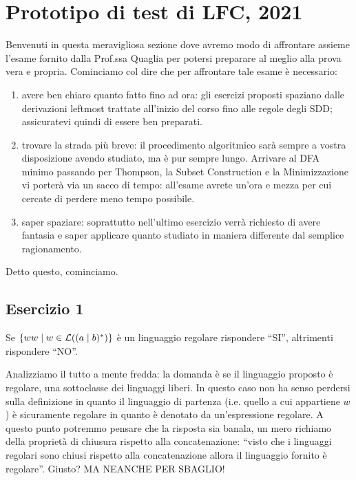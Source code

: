 \documentclass[class=book, crop=false, oneside, 12pt]{standalone}
\begin{document}
\chapter{Prototipo di test di LFC, 2021}


Benvenuti in questa meravigliosa sezione dove avremo modo di affrontare assieme l'esame fornito dalla Prof.ssa Quaglia per potersi preparare al meglio alla prova vera e propria. Cominciamo col dire che per affrontare tale esame è necessario:

\begin{enumerate}
    \item avere ben chiaro quanto fatto fino ad ora: gli esercizi proposti spaziano dalle derivazioni leftmost trattate all'inizio del corso fino alle regole degli SDD; assicuratevi quindi di essere ben preparati.
    \item trovare la strada più breve: il procedimento algoritmico sarà sempre a vostra disposizione avendo studiato, ma è pur sempre lungo. Arrivare al DFA minimo passando per Thompson, la Subset Construction e la Minimizzazione vi porterà via un sacco di tempo: all'esame avrete un'ora e mezza per cui cercate di perdere meno tempo possibile.
    \item saper spaziare: soprattutto nell'ultimo esercizio verrà richiesto di avere fantasia e saper applicare quanto studiato in maniera differente dal semplice ragionamento.
\end{enumerate}

Detto questo, cominciamo.

\section*{Esercizio 1}

Se \(\{ww \mid w \in \mathcal{L}((a \mid b)^*)\}\) è un linguaggio regolare rispondere “SI”, altrimenti rispondere “NO”.

Analizziamo il tutto a mente fredda: la domanda è se il linguaggio proposto è regolare, una sottoclasse dei linguaggi liberi. In questo caso non ha senso perdersi sulla definizione in quanto il linguaggio di partenza (i.e. quello a cui appartiene \(w\)) è sicuramente regolare in quanto è denotato da un'espressione regolare. A questo punto potremmo pensare che la risposta sia banala, un mero richiamo della proprietà di chiusura rispetto alla concatenazione: “visto che i linguaggi regolari sono chiusi rispetto alla concatenazione allora il linguaggio fornito è regolare”. Giusto? MA NEANCHE PER SBAGLIO! 
\end{document}
